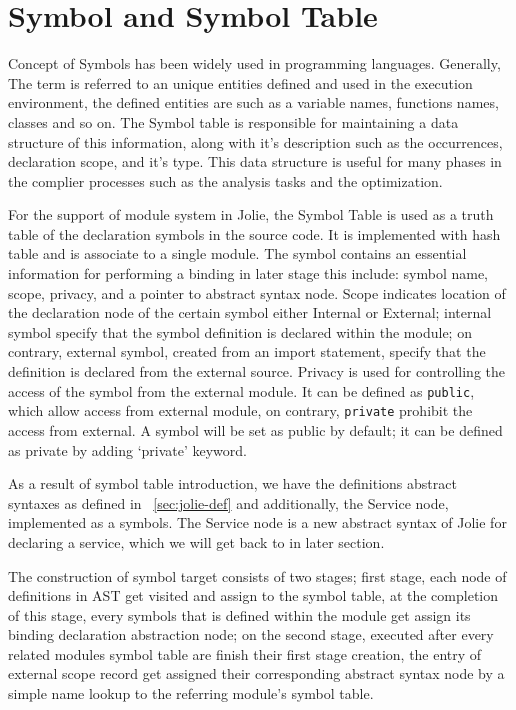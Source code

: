 
\section{Symbol and Symbol Table}

Concept of Symbols has been widely used in programming languages. Generally, The term is referred to an unique entities defined and used in the execution environment, the defined entities are such as a variable names, functions names, classes and so on.
The Symbol table is responsible for maintaining a data structure of this information, along with it's description such as the occurrences, declaration scope, and it's type. This data structure is useful for many phases in the complier processes such as the analysis tasks and the optimization.

For the support of module system in Jolie, the Symbol Table is used as a truth table of the declaration symbols in the source code.
It is implemented with hash table and is associate to a single module.
The symbol contains an essential information for performing a binding in later stage this include: symbol name, scope, privacy, and a pointer to abstract syntax node.
Scope indicates location of the declaration node of the certain symbol either Internal or External; internal symbol specify that the symbol definition is declared within the module; on contrary, external symbol, created from an import statement, specify that the definition is declared from the external source.
Privacy is used for controlling the access of the symbol from the external module. It can be defined as \texttt{public}, which allow access from external module, on contrary, \texttt{private} prohibit the access from external. A symbol will be set as public by default; it can be defined as private by adding `private' keyword.

As a result of symbol table introduction, we have the definitions abstract syntaxes as defined in ~\ref{sec:jolie-def} and additionally, the Service node, implemented as a symbols. The Service node is a new abstract syntax of Jolie for declaring a service, which we will get back to in later section.

The construction of symbol target consists of two stages; first stage, each node of definitions in AST get visited and assign to the symbol table, at the completion of this stage, every symbols that is defined within the module get assign its binding declaration abstraction node; on the second stage, executed after every related modules symbol table are finish their first stage creation, the entry of external scope record get assigned their corresponding abstract syntax node by a simple name lookup to the referring module's symbol table.

